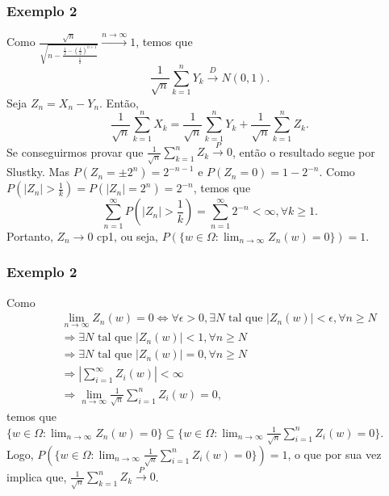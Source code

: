 \begin{frame}
\frametitle{\textbf{Exemplo 2}}
\baselineskip=13pt
\begin{block}{}


Como $\frac{\sqrt{n}}{\sqrt{n-\frac{\frac{1}{2}-(\frac{1}{2})^{n+1}}{\frac{1}{2}}}}\xrightarrow{n\rightarrow\infty}1$, temos que
$$\frac{1}{\sqrt{n}}\sum_{k=1}^{n}Y_k\xrightarrow{D}N(0,1).$$
Seja $Z_n=X_n-Y_n$. Então,
$$\frac{1}{\sqrt{n}}\sum_{k=1}^{n}X_k=\frac{1}{\sqrt{n}}\sum_{k=1}^{n}Y_k+\frac{1}{\sqrt{n}}\sum_{k=1}^{n}Z_k.$$
Se conseguirmos provar que $\frac{1}{\sqrt{n}}\sum_{k=1}^{n}Z_k\xrightarrow{P}0$, então o resultado segue por Slustky. Mas $P(Z_n=\pm 2^{n})=2^{-n-1}$ e $P(Z_n=0)=1-2^{-n}$. Como $P(|Z_n|>\frac{1}{k})=P(|Z_n|=2^n)=2^{-n}$, temos que
$$\sum_{n=1}^{\infty}P(|Z_n|>\frac{1}{k})=\sum_{n=1}^{\infty}2^{-n}<\infty,\forall k\geq 1.$$
Portanto, $Z_n\rightarrow 0$ cp1, ou seja, $P(\{w\in\Omega:\lim_{n\rightarrow\infty}Z_n(w)=0\})=1$.

\end{block}
\end{frame}

\begin{frame}
\frametitle{\textbf{Exemplo 2}}
\baselineskip=13pt
\begin{block}{}


Como
\begin{eqnarray}
& & \lim_{n\rightarrow\infty}Z_n(w)=0 \Leftrightarrow \forall \epsilon>0, \exists N \mbox{ tal que } |Z_n(w)|<\epsilon, \forall n\geq N\nonumber\\
& & \Rightarrow \exists N \mbox{ tal que } |Z_n(w)|<1, \forall n\geq N\nonumber\\
& & \Rightarrow \exists N \mbox{ tal que } |Z_n(w)|=0, \forall n\geq N\nonumber\\
& & \Rightarrow |\sum_{i=1}^{\infty}Z_i(w)|<\infty \nonumber\\
& & \Rightarrow \lim_{n\rightarrow\infty}\frac{1}{\sqrt{n}}\sum_{i=1}^{n}Z_i(w)=0,\nonumber
\end{eqnarray}
temos que $\{w\in\Omega:\lim_{n\rightarrow\infty}Z_n(w)=0\}\subseteq \{w\in\Omega:\lim_{n\rightarrow\infty}\frac{1}{\sqrt{n}}\sum_{i=1}^{n}Z_i(w)=0\}$. Logo, $P(\{w\in\Omega:\lim_{n\rightarrow\infty}\frac{1}{\sqrt{n}}\sum_{i=1}^{n}Z_i(w)=0\})=1$, o que por sua vez implica que,
$\frac{1}{\sqrt{n}}\sum_{k=1}^{n}Z_k\xrightarrow{P}0$.

\end{block}
\end{frame}


